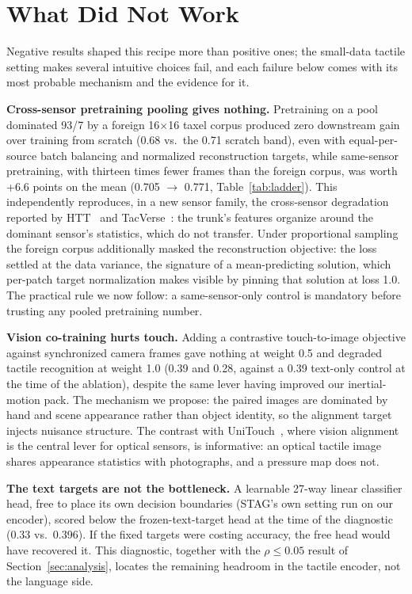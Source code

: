 \documentclass[conference]{IEEEtran}
\begin{document}
\section{What Did Not Work}
\label{sec:negative}
Negative results shaped this recipe more than positive ones; the small-data tactile
setting makes several intuitive choices fail, and each failure below comes with its most
probable mechanism and the evidence for it.

\textbf{Cross-sensor pretraining pooling gives nothing.} Pretraining on a pool dominated
93/7 by a foreign 16$\times$16 taxel corpus produced zero downstream gain over training
from scratch (0.68 vs.\ the 0.71 scratch band), even with equal-per-source batch balancing
and normalized reconstruction targets, while same-sensor pretraining, with thirteen times
fewer frames than the foreign corpus, was worth +6.6 points on the mean (0.705
$\rightarrow$ 0.771, Table~\ref{tab:ladder}). This independently reproduces, in a new sensor family,
the cross-sensor degradation reported by HTT~\cite{bi2026htt} and
TacVerse~\cite{wei2026tacverse}: the trunk's features organize around the dominant sensor's
statistics, which do not transfer. Under proportional sampling the foreign corpus
additionally masked the reconstruction objective: the loss settled at the data variance,
the signature of a mean-predicting solution, which per-patch target normalization makes
visible by pinning that solution at loss 1.0. The practical rule we now follow: a
same-sensor-only control is mandatory before trusting any pooled pretraining number.

\textbf{Vision co-training hurts touch.} Adding a contrastive touch-to-image objective
against synchronized camera frames gave nothing at weight 0.5 and degraded tactile
recognition at weight 1.0 (0.39 and 0.28, against a 0.39 text-only control at the time of
the ablation), despite the same lever having improved our inertial-motion pack.
The mechanism we propose: the paired images are dominated by hand and scene appearance
rather than object identity, so the alignment target injects nuisance structure. The
contrast with UniTouch~\cite{yang2024unitouch}, where vision alignment is the central
lever for optical sensors, is informative: an optical tactile image shares appearance
statistics with photographs, and a pressure map does not.

\textbf{The text targets are not the bottleneck.} A learnable 27-way linear classifier
head, free to place its own decision boundaries (STAG's own setting run on our encoder),
scored below the frozen-text-target head at the time of the diagnostic (0.33 vs.\ 0.396).
If the fixed targets were costing accuracy, the free head would have recovered it. This
diagnostic, together with the $\rho \le 0.05$ result of Section~\ref{sec:analysis},
locates the remaining headroom in the tactile encoder, not the language side.
\end{document}
